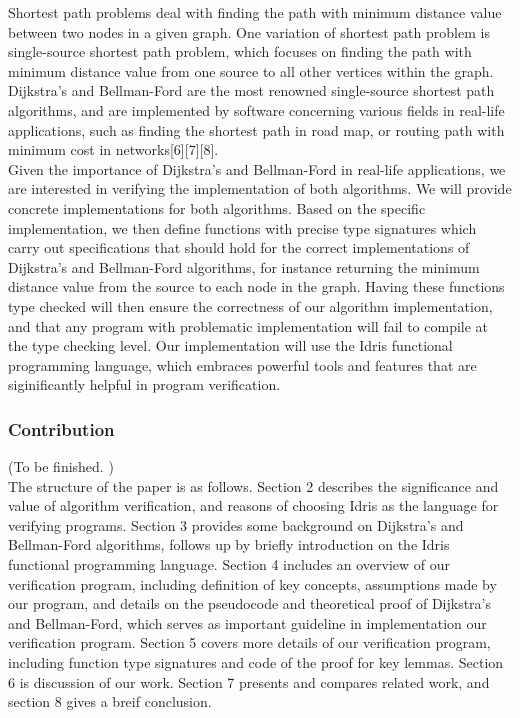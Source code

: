 Shortest path problems deal with finding the path with minimum distance value between two nodes in a given graph. One variation of shortest path problem is single-source shortest path problem, which focuses on finding the path with minimum distance value from one source to all other vertices within the graph. Dijkstra's and Bellman-Ford are the most renowned single-source shortest path algorithms, and are implemented by software concerning various fields in real-life applications, such as finding the shortest path in road map, or routing path with minimum cost in networks[6][7][8]. 
\\

Given the importance of Dijkstra's and Bellman-Ford in real-life applications, we are interested in verifying the implementation of both algorithms. We will provide concrete implementations for both algorithms. Based on the specific implementation, we then define functions with precise type signatures which carry out specifications that should hold for the correct implementations of Dijkstra's and Bellman-Ford algorithms, for instance returning the minimum distance value from the source to each node in the graph. Having these functions type checked will then ensure the correctness of our algorithm implementation, and that any program with problematic implementation will fail to compile at the type checking level. Our implementation will use the Idris functional programming language, which embraces powerful tools and features that are siginificantly helpful in program verification.

\subsubsection*{Contribution}
(To be finished. )
\\

The structure of the paper is as follows. Section 2 describes the significance and value of algorithm verification, and reasons of choosing Idris as the language for verifying programs. Section 3 provides some background on Dijkstra's and Bellman-Ford algorithms, follows up by briefly introduction on the Idris functional programming language. Section 4 includes an overview of our verification program, including definition of key concepts, assumptions made by our program, and details on the pseudocode and theoretical proof of Dijkstra's and Bellman-Ford, which serves as important guideline in implementation our verification program. Section 5 covers more details of our verification program, including function type signatures and code of the proof for key lemmas. Section 6 is discussion of our work. Section 7 presents and compares related work, and section 8 gives a breif conclusion.  
